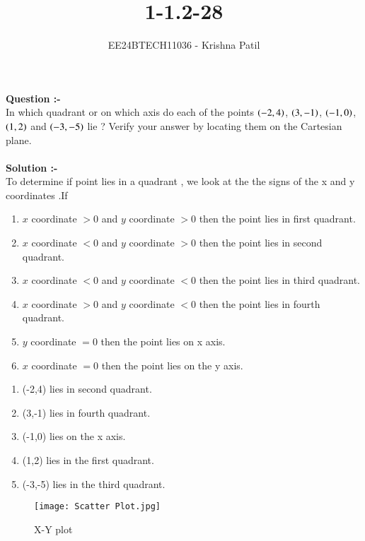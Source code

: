 \documentclass[journal]{IEEEtran}
\begin{document}

\vspace{3cm}

\title{1-1.2-28}
\author{EE24BTECH11036 - Krishna Patil}
{\let\newpage\relax\maketitle}

\renewcommand{\thefigure}{\theenumi}
\renewcommand{\thetable}{\theenumi}
\setlength{\intextsep}{10pt} %


\renewcommand{\thetable}{\theenumi}

\textbf { Question :- } \\
 In which quadrant or on which axis do each of the points {$ \left(-2,4 \right)$}, {$ \left(3,-1\right) $}, {$ \left(-1,0\right) $}, {$ \left(1,2\right) $} and {$ \left(-3,-5\right) $} lie ? Verify your answer by locating them on the Cartesian plane. \\ \\
\textbf { Solution :- } \\
To determine if point lies in a quadrant , we look at the the signs of the x and y coordinates .If
\begin{enumerate}
\item $ x $ coordinate $ > 0 $ and $ y $ coordinate $ > 0 $ then the point lies in first quadrant.
\item $ x $ coordinate $ < 0 $ and $ y $ coordinate $ > 0 $ then the point lies in second quadrant.
\item $ x $ coordinate $ < 0 $ and $ y $ coordinate $ < 0 $ then the point lies in third quadrant.
\item $ x $ coordinate $ > 0 $ and $ y $ coordinate $ < 0 $ then the point lies in fourth quadrant.
\item $ y $ coordinate $ = 0 $ then the point lies on x axis.
\item $ x $ coordinate $ = 0 $ then the point lies on the y axis.
\end{enumerate} 
 
\begin{enumerate}
\item (-2,4) lies in second quadrant.
\item (3,-1) lies in fourth quadrant.
\item (-1,0) lies on the x axis.
\item (1,2) lies in the first quadrant.
\item (-3,-5) lies in the third quadrant.
\end {enumerate} 
\begin{figure}[h!]
   \centering
   \texttt{[image: Scatter Plot.jpg]}
   \caption{X-Y plot}
   \label{x-yplot}
\end{figure}
\end{document}
